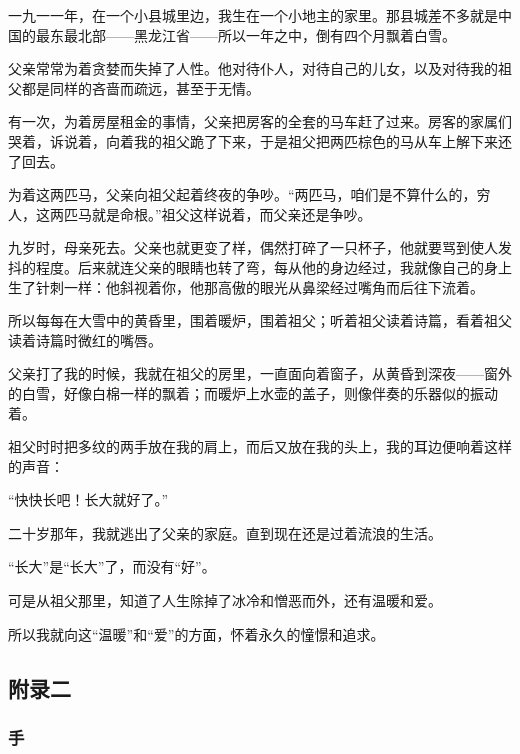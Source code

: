 \par 一九一一年，在一个小县城里边，我生在一个小地主的家里。那县城差不多就是中国的最东最北部——黑龙江省——所以一年之中，倒有四个月飘着白雪。
\par 父亲常常为着贪婪而失掉了人性。他对待仆人，对待自己的儿女，以及对待我的祖父都是同样的吝啬而疏远，甚至于无情。
\par 有一次，为着房屋租金的事情，父亲把房客的全套的马车赶了过来。房客的家属们哭着，诉说着，向着我的祖父跪了下来，于是祖父把两匹棕色的马从车上解下来还了回去。
\par 为着这两匹马，父亲向祖父起着终夜的争吵。“两匹马，咱们是不算什么的，穷人，这两匹马就是命根。”祖父这样说着，而父亲还是争吵。
\par 九岁时，母亲死去。父亲也就更变了样，偶然打碎了一只杯子，他就要骂到使人发抖的程度。后来就连父亲的眼睛也转了弯，每从他的身边经过，我就像自己的身上生了针刺一样：他斜视着你，他那高傲的眼光从鼻梁经过嘴角而后往下流着。
\par 所以每每在大雪中的黄昏里，围着暖炉，围着祖父；听着祖父读着诗篇，看着祖父读着诗篇时微红的嘴唇。
\par 父亲打了我的时候，我就在祖父的房里，一直面向着窗子，从黄昏到深夜——窗外的白雪，好像白棉一样的飘着；而暖炉上水壶的盖子，则像伴奏的乐器似的振动着。
\par 祖父时时把多纹的两手放在我的肩上，而后又放在我的头上，我的耳边便响着这样的声音：
\par “快快长吧！长大就好了。”
\par 二十岁那年，我就逃出了父亲的家庭。直到现在还是过着流浪的生活。
\par “长大”是“长大”了，而没有“好”。
\par 可是从祖父那里，知道了人生除掉了冰冷和憎恶而外，还有温暖和爱。
\par 所以我就向这“温暖”和“爱”的方面，怀着永久的憧憬和追求。
\par {}
\par {}

\subsection{附录二}



\subsubsection{手}

